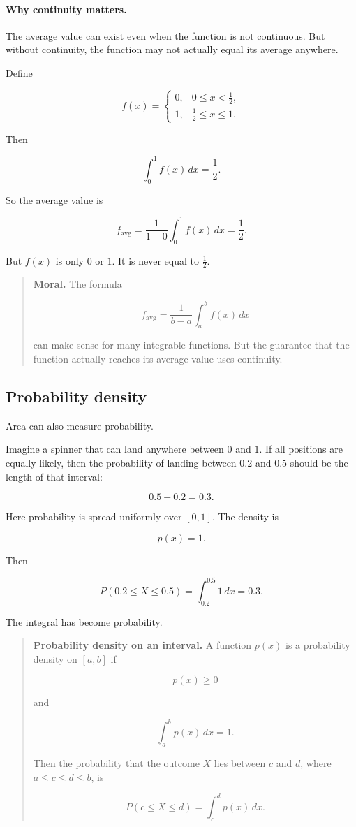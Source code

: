 \paragraph{Why continuity matters.}
The average value can exist even when the function is not continuous.  But without
continuity, the function may not actually equal its average anywhere.

Define

\[
f(x)=
\begin{cases}
0, & 0\le x<\frac12,\\
1, & \frac12\le x\le1.
\end{cases}
\]

Then

\[
\int_0^1 f(x)\,dx=\frac12.
\]

So the average value is

\[
f_{\text{avg}}
=
\frac1{1-0}\int_0^1 f(x)\,dx
=
\frac12.
\]

But \(f(x)\) is only \(0\) or \(1\).  It is never equal to \(\frac12\).

\begin{quote}
\textbf{Moral.}
The formula

\[
f_{\text{avg}}=\frac1{b-a}\int_a^b f(x)\,dx
\]

can make sense for many integrable functions.  But the guarantee that the function
actually reaches its average value uses continuity.
\end{quote}

\subsection{Probability density}
\label{subsec:probability-density}

Area can also measure probability.

Imagine a spinner that can land anywhere between \(0\) and \(1\).  If all positions are
equally likely, then the probability of landing between \(0.2\) and \(0.5\) should be the
length of that interval:

\[
0.5-0.2=0.3.
\]

Here probability is spread uniformly over \([0,1]\).  The density is

\[
p(x)=1.
\]

Then

\[
P(0.2\le X\le0.5)
=
\int_{0.2}^{0.5}1\,dx
=
0.3.
\]

The integral has become probability.

\begin{quote}
\textbf{Probability density on an interval.}
A function \(p(x)\) is a probability density on \([a,b]\) if

\[
p(x)\ge0
\]

and

\[
\boxed{
\int_a^b p(x)\,dx=1.
}
\]

Then the probability that the outcome \(X\) lies between \(c\) and \(d\), where
\(a\le c\le d\le b\), is

\[
\boxed{
P(c\le X\le d)=\int_c^d p(x)\,dx.
}
\]
\end{quote}

